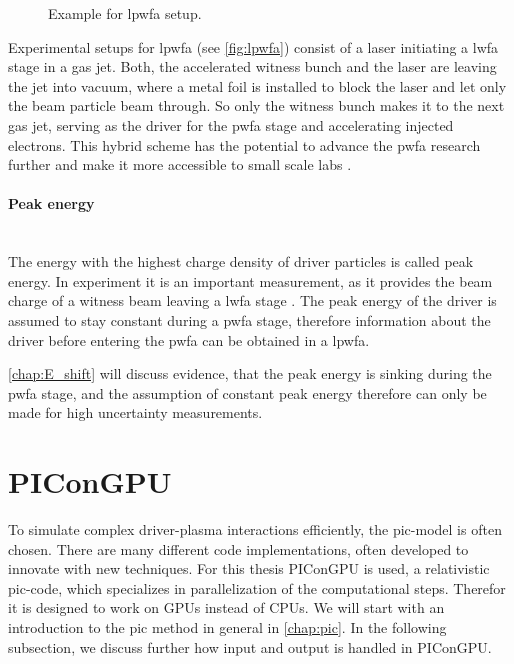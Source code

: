 \documentclass[bachelor_thesis]{subfiles}
\begin{document}
\begin{figure}
	\centering
	\caption{Example for \gls{lpwfa} setup.}
	\label{fig:lpwfa}
\end{figure}
Experimental setups for \gls{lpwfa} (see \autoref{fig:lpwfa}) consist of a laser initiating a \gls{lwfa} stage in a gas jet. 
Both, the accelerated witness bunch and the laser are leaving the jet into vacuum, where a metal foil is installed to block the laser and let only the beam particle beam through. 
So only the witness bunch makes it to the next gas jet, serving as the driver for the \gls{pwfa} stage and accelerating injected electrons.
This hybrid scheme has the potential to advance the \gls{pwfa} research further and make it more accessible to small scale labs \cite{Kurz2021}.

\paragraph*{Peak energy}\hspace{0pt} \\
The energy with the highest charge density of driver particles is called peak energy. In experiment it is an important measurement, as it provides the beam charge of a witness beam leaving a \gls{lwfa} stage \cite{Schoebel2022}.
The peak energy of the driver is assumed to stay constant during a \gls{pwfa} stage, therefore information about the driver before entering the \gls{pwfa} can be obtained in a \gls{lpwfa}.

\autoref{chap:E_shift} will discuss evidence, that the peak energy is sinking during the \gls{pwfa} stage, and the assumption of constant peak energy therefore can only be made for high uncertainty measurements.

\section{PIConGPU}
To simulate complex driver-plasma interactions efficiently, the \gls{pic}-model is often chosen. There are many different code implementations, often developed to innovate with new techniques. For this thesis PIConGPU \cite{PIConGPU2013, PICRepo} is used, 
a relativistic \gls{pic}-code, which specializes in parallelization of the computational steps. Therefor it is designed to work on GPUs instead of CPUs. We will start with an introduction to the \gls{pic} method in general in \autoref{chap:pic}.
In the following subsection, we discuss further how input and output is handled in PIConGPU.
\end{document}
